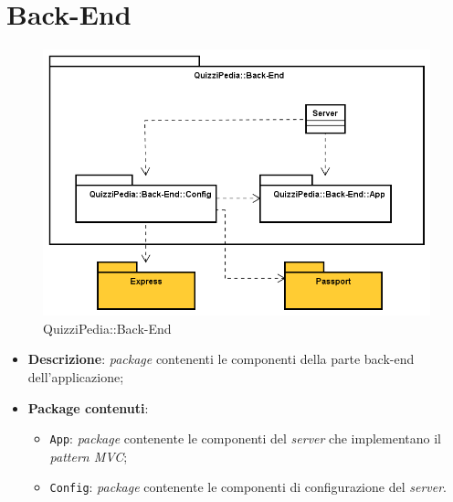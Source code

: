 \newpage
\section{Back-End}
\label{QuizziPedia::Back-End}
\begin{figure}[ht]
	\centering
	\includegraphics[scale=0.7]{UML/Package/QuizziPedia_Back-End.png}
	\caption{QuizziPedia::Back-End}
\end{figure}
\FloatBarrier
\begin{itemize}
	\item \textbf{Descrizione}:
	\textit{package} contenenti le componenti della parte back-end dell'applicazione;
	\item \textbf{Package contenuti}:
	\begin{itemize}
		\item \texttt{App}:
		\textit{package} contenente le componenti del \textit{server} che implementano il \textit{pattern MVC};
		\item \texttt{Config}:
		\textit{package} contenente le componenti di configurazione del \textit{server}.
	\end{itemize}
\end{itemize}


	

